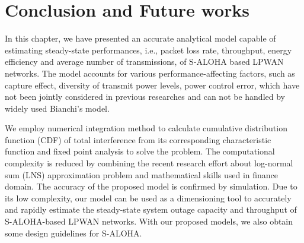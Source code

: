 \section{Conclusion and Future works}
\label{sec:icc17-conclusion}
In this chapter, we have presented an accurate analytical model capable of estimating steady-state performances, i.e., packet loss rate, throughput, energy efficiency and average number of transmissions, of S-ALOHA based LPWAN networks. The model accounts for various performance-affecting factors, such as capture effect, diversity of transmit power levels, power control error, which have not been jointly considered in previous researches and can not be handled by widely used Bianchi's model.

We employ numerical integration method to calculate cumulative distribution function (CDF) of total interference from its corresponding characteristic function and fixed point analysis to solve the problem. The computational complexity is reduced by combining the recent research effort about log-normal sum (LNS) approximation problem and mathematical skills used in finance domain. The accuracy of the proposed model is confirmed by simulation. Due to its low complexity, our model can be used as a dimensioning tool to accurately and rapidly estimate the steady-state system outage capacity and throughput of  S-ALOHA-based LPWAN networks. With our proposed models, we also obtain some design guidelines for S-ALOHA.
%
%
